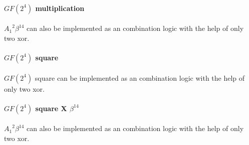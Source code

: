 \documentclass[10pt, conference, compsocconf]{IEEEtran}
\begin{document}
\paragraph{$GF(2^4)$ multiplication }
${A_1}^2\beta^{14}$ can also be implemented as an combination logic with the help of only two xor.

\paragraph{$GF(2^4)$ square}
$GF(2^4)$ square can be implemented as an combination logic with the help of only two xor.

\paragraph{$GF(2^4)$ square X $\beta^{14}$}
${A_1}^2\beta^{14}$ can also be implemented as an combination logic with the help of only two xor.
\end{document}
